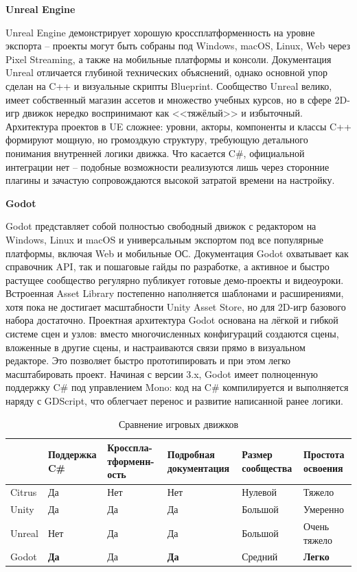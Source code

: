         \textbf{Unreal Engine}

        Unreal Engine демонстрирует хорошую кроссплатформенность на уровне экспорта -- проекты могут быть собраны под Windows, macOS, Linux, Web через Pixel Streaming, а также на 
        мобильные платформы и консоли. Документация Unreal отличается глубиной технических объяснений, однако основной упор сделан на C++ и визуальные скрипты Blueprint. 
        Сообщество Unreal велико, имеет собственный магазин ассетов и множество учебных курсов, но в сфере 2D-игр движок нередко воспринимают как <<тяжёлый>> и избыточный. 
        Архитектура проектов в UE сложнее: уровни, акторы, компоненты и классы C++ формируют мощную, но громоздкую структуру, требующую детального понимания внутренней логики движка. 
        Что касается C\#, официальной интеграции нет -- подобные возможности реализуются лишь через сторонние плагины и зачастую сопровождаются высокой затратой времени на настройку.
        
        \textbf{Godot}

        Godot представляет собой полностью свободный движок с редактором на Windows, Linux и macOS и универсальным экспортом под все популярные платформы, включая Web и мобильные ОС. 
        Документация Godot охватывает как справочник API, так и пошаговые гайды по разработке, а активное и быстро растущее сообщество регулярно публикует готовые демо-проекты и видеоуроки. 
        Встроенная Asset Library постепенно наполняется шаблонами и расширениями, хотя пока не достигает масштабности Unity Asset Store, но для 2D-игр базового набора достаточно.
        Проектная архитектура Godot основана на лёгкой и гибкой системе сцен и узлов: вместо многочисленных конфигураций создаются сцены, вложенные в другие сцены, и настраиваются связи 
        прямо в визуальном редакторе. Это позволяет быстро прототипировать и при этом легко масштабировать проект. Начиная с версии 3.x, Godot имеет полноценную поддержку C\# под управлением 
        Mono: код на C\# компилируется и выполняется наряду с GDScript, что облегчает перенос и развитие написанной ранее логики.

        \begin{table}[ht]
            \caption{Сравнение игровых движков}
            \centering
            \renewcommand{\arraystretch}{1.2}
            \renewcommand{\tablename}{Табл.}
            \begin{tabularx}{\textwidth}{|X|X|X|X|X|X|}
            \hline
            &\textbf{Поддержка C\#} & \textbf{Кросспла-тформенн-ость} & \textbf{Подробная документация} & \textbf{Размер сообщества} & \textbf{Простота освоения} \\
            \hline
            Citrus&Да&Нет&Нет& Нулевой&Тяжело\\
            \hline
            Unity&Да&Да&Да& Большой&Умеренно\\
            \hline
            Unreal&Нет&Да&Да&Большой&Очень тяжело\\
            \hline
            Godot&\textbf{Да}&Да&\textbf{Да}&Средний&\textbf{Легко}\\
            \hline
            \end{tabularx}
        \end{table}

